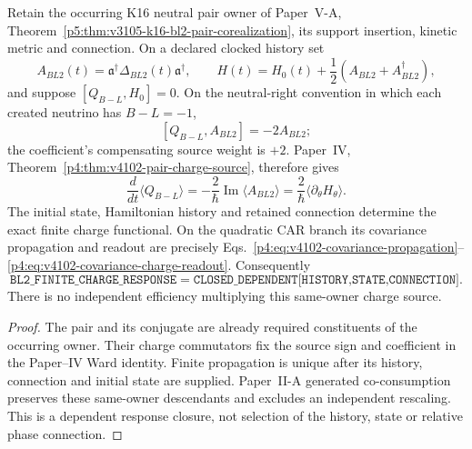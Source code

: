 \documentclass[12pt,a4paper]{article}
\begin{document}
\begin{theorem}
\label{p5c:thm:v273-bl2-charge-response}
Retain the occurring K16 neutral pair owner of Paper~V-A,
Theorem~\ref{p5:thm:v3105-k16-bl2-pair-corealization}, its support insertion,
kinetic metric and connection.  On a declared clocked history set
\[
 A_{BL2}(t)=\mathfrak a^\dagger\Delta_{BL2}(t)\mathfrak a^\dagger,
 \qquad H(t)=H_0(t)+\frac12(A_{BL2}+A_{BL2}^\dagger),
\]
and suppose $[Q_{B-L},H_0]=0$.  On the neutral-right convention in which each
created neutrino has $B-L=-1$,
\[
 [Q_{B-L},A_{BL2}]=-2A_{BL2};
\]
the coefficient's compensating source weight is $+2$.  Paper~IV,
Theorem~\ref{p4:thm:v4102-pair-charge-source}, therefore gives
\begin{equation}
\label{p5c:eq:v273-bl2-charge-source}
 \boxed{
 \frac d{dt}\langle Q_{B-L}\rangle
 =-\frac2\hbar\operatorname{Im}\langle A_{BL2}\rangle
 =\frac2\hbar\langle\partial_\theta H_\theta\rangle.}
\end{equation}
The initial state, Hamiltonian history and retained connection determine the
exact finite charge functional.  On the quadratic CAR branch its covariance
propagation and readout are precisely
Eqs.~\eqref{p4:eq:v4102-covariance-propagation}--\eqref{p4:eq:v4102-covariance-charge-readout}.
Consequently
\[
 \boxed{\texttt{BL2\_FINITE\_CHARGE\_RESPONSE}
 =\texttt{CLOSED\_DEPENDENT[HISTORY,STATE,CONNECTION]}.}
\]
There is no independent efficiency multiplying this same-owner charge source.
\end{theorem}

\begin{proof}
The pair and its conjugate are already required constituents of the occurring
owner.  Their charge commutators fix the source sign and coefficient in the
Paper--IV Ward identity.  Finite propagation is unique after its history,
connection and initial state are supplied.  Paper~II-A generated
co-consumption preserves these same-owner descendants and excludes an
independent rescaling.  This is a dependent response closure, not selection
of the history, state or relative phase connection.
\end{proof}
\end{document}
